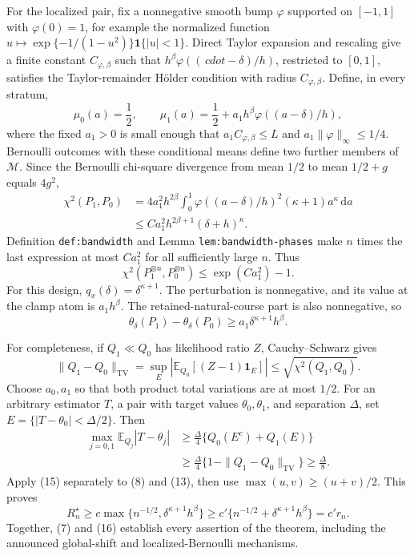 For the localized pair, fix a nonnegative smooth bump \(\varphi\) supported on \([-1,1]\) with \(\varphi(0)=1\), for example the normalized function \(u\mapsto\exp\{-1/(1-u^2)\}\mathbf 1\{|u|<1\}\).  Direct Taylor expansion and rescaling give a finite constant \(C_{\varphi,\beta}\) such that \(h^\beta\varphi((\,cdot-\delta)/h)\), restricted to \([0,1]\), satisfies the Taylor-remainder Hölder condition with radius \(C_{\varphi,\beta}\).  Define, in every stratum,
\[
 \mu_0(a)=\frac12,
 \qquad
 \mu_1(a)=\frac12+a_1h^\beta\varphi((a-\delta)/h), \tag{10}
\]
where the fixed \(a_1>0\) is small enough that \(a_1C_{\varphi,\beta}\leq L\) and \(a_1\|\varphi\|_\infty\leq1/4\).  Bernoulli outcomes with these conditional means define two further members of \(\mathcal M\).  Since the Bernoulli chi-square divergence from mean \(1/2\) to mean \(1/2+g\) equals \(4g^2\),
\[
 \begin{aligned}
 \chi^2(P_1,P_0)
 &=4a_1^2h^{2\beta}\int_0^1
   \varphi((a-\delta)/h)^2(\kappa+1)a^\kappa\,\mathrm da\\
 &\leq Ca_1^2h^{2\beta+1}(\delta+h)^\kappa.
 \end{aligned} \tag{11}
\]
Definition \texttt{def:bandwidth} and Lemma \texttt{lem:bandwidth-phases} make \(n\) times the last expression at most \(Ca_1^2\) for all sufficiently large \(n\).  Thus
\[
 \chi^2(P_1^{\otimes n},P_0^{\otimes n})
 \leq\exp(Ca_1^2)-1. \tag{12}
\]
For this design, \(q_x(\delta)=\delta^{\kappa+1}\).  The perturbation is nonnegative, and its value at the clamp atom is \(a_1h^\beta\).  The retained-natural-course part is also nonnegative, so
\[
 \theta_\delta(P_1)-\theta_\delta(P_0)
 \geq a_1\delta^{\kappa+1}h^\beta. \tag{13}
\]

For completeness, if \(Q_1\ll Q_0\) has likelihood ratio \(Z\), Cauchy--Schwarz gives
\[
 \|Q_1-Q_0\|_{\mathrm{TV}}
 =\sup_E|\mathbb E_{Q_0}[(Z-1)\mathbf 1_E]|
 \leq\sqrt{\chi^2(Q_1,Q_0)}. \tag{14}
\]
Choose \(a_0,a_1\) so that both product total variations are at most \(1/2\).  For an arbitrary estimator \(T\), a pair with target values \(\theta_0,\theta_1\), and separation \(\Delta\), set \(E=\{|T-\theta_0|<\Delta/2\}\).  Then
\[
 \begin{aligned}
 \max_{j=0,1}\mathbb E_{Q_j}|T-\theta_j|
 &\geq\frac{\Delta}{4}\{Q_0(E^c)+Q_1(E)\}\\
 &\geq\frac{\Delta}{4}\{1-\|Q_1-Q_0\|_{\mathrm{TV}}\}
 \geq\frac{\Delta}{8}.
 \end{aligned} \tag{15}
\]
Apply (15) separately to (8) and (13), then use \(\max(u,v)\geq(u+v)/2\).  This proves
\[
 R_n^\star\geq c\max\{n^{-1/2},\delta^{\kappa+1}h^\beta\}
 \geq c'\{n^{-1/2}+\delta^{\kappa+1}h^\beta\}=c'r_n. \tag{16}
\]
Together, (7) and (16) establish every assertion of the theorem, including the announced global-shift and localized-Bernoulli mechanisms.